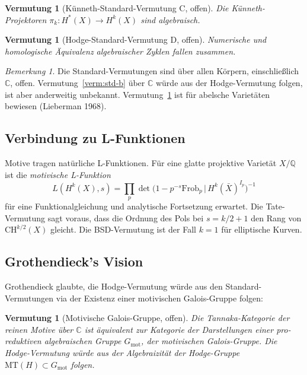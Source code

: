 \documentclass[12pt,a4paper]{amsart}
\newtheorem{vermutung}[theorem]{Vermutung}
\theoremstyle{definition}
\theoremstyle{remark}
\newtheorem{bemerkung}[theorem]{Bemerkung}
\begin{document}
\begin{vermutung}[Künneth-Standard-Vermutung C, offen]
\label{verm:std-c}
Die Künneth-Projektoren $\pi_k: H^*(X) \to H^k(X)$ sind algebraisch.
\end{vermutung}

\begin{vermutung}[Hodge-Standard-Vermutung D, offen]
\label{verm:std-d}
Numerische und homologische Äquivalenz algebraischer Zyklen fallen zusammen.
\end{vermutung}

\begin{bemerkung}
Die Standard-Vermutungen sind über allen Körpern, einschließlich $\mathbb{C}$, offen.
Vermutung~\ref{verm:std-b} über $\mathbb{C}$ würde aus der Hodge-Vermutung folgen,
ist aber anderweitig unbekannt. Vermutung~\ref{verm:std-d} ist für abelsche Varietäten
bewiesen (Lieberman 1968).
\end{bemerkung}

\subsection{Verbindung zu L-Funktionen}

Motive tragen natürliche L-Funktionen. Für eine glatte projektive Varietät $X/\mathbb{Q}$
ist die \emph{motivische L-Funktion}
\[
  L(H^k(X), s) = \prod_p \det\bigl(1 - p^{-s} \mathrm{Frob}_p \,|\, H^k(\bar X)^{I_p}\bigr)^{-1}
\]
für eine Funktionalgleichung und analytische Fortsetzung erwartet. Die
Tate-Vermutung sagt voraus, dass die Ordnung des Pols bei $s = k/2 + 1$ den Rang von
$\mathrm{CH}^{k/2}(X)$ gleicht. Die BSD-Vermutung ist der Fall $k = 1$ für elliptische Kurven.

\subsection{Grothendieck's Vision}

Grothendieck glaubte, die Hodge-Vermutung würde aus den Standard-Vermutungen via
der Existenz einer motivischen Galois-Gruppe folgen:

\begin{vermutung}[Motivische Galois-Gruppe, offen]
\label{verm:motivische-galois}
Die Tannaka-Kategorie der reinen Motive über $\mathbb{C}$ ist äquivalent zur
Kategorie der Darstellungen einer pro-reduktiven algebraischen Gruppe $G_{\mathrm{mot}}$,
der \emph{motivischen Galois-Gruppe}. Die Hodge-Vermutung würde aus der Algebraizität
der Hodge-Gruppe $\mathrm{MT}(H) \subset G_{\mathrm{mot}}$ folgen.
\end{vermutung}
\end{document}
